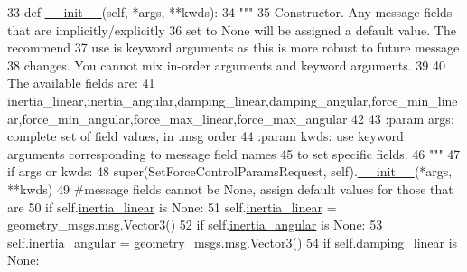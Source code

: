 \begin{DoxyCode}
33   \textcolor{keyword}{def }\hyperlink{classjaco__msgs_1_1srv_1_1__SetForceControlParams_1_1SetForceControlParamsRequest_a70d95a44801ab7fb588b293e5a4720b1}{\_\_init\_\_}(self, *args, **kwds):
34     \textcolor{stringliteral}{"""}
35 \textcolor{stringliteral}{    Constructor. Any message fields that are implicitly/explicitly}
36 \textcolor{stringliteral}{    set to None will be assigned a default value. The recommend}
37 \textcolor{stringliteral}{    use is keyword arguments as this is more robust to future message}
38 \textcolor{stringliteral}{    changes.  You cannot mix in-order arguments and keyword arguments.}
39 \textcolor{stringliteral}{}
40 \textcolor{stringliteral}{    The available fields are:}
41 \textcolor{stringliteral}{      
       inertia\_linear,inertia\_angular,damping\_linear,damping\_angular,force\_min\_linear,force\_min\_angular,force\_max\_linear,force\_max\_angular}
42 \textcolor{stringliteral}{}
43 \textcolor{stringliteral}{    :param args: complete set of field values, in .msg order}
44 \textcolor{stringliteral}{    :param kwds: use keyword arguments corresponding to message field names}
45 \textcolor{stringliteral}{    to set specific fields.}
46 \textcolor{stringliteral}{    """}
47     \textcolor{keywordflow}{if} args \textcolor{keywordflow}{or} kwds:
48       super(SetForceControlParamsRequest, self).\hyperlink{classjaco__msgs_1_1srv_1_1__SetForceControlParams_1_1SetForceControlParamsRequest_a70d95a44801ab7fb588b293e5a4720b1}{\_\_init\_\_}(*args, **kwds)
49       \textcolor{comment}{#message fields cannot be None, assign default values for those that are}
50       \textcolor{keywordflow}{if} self.\hyperlink{classjaco__msgs_1_1srv_1_1__SetForceControlParams_1_1SetForceControlParamsRequest_ab5cf9f4019e6c446ca473ca2a38492ad}{inertia\_linear} \textcolor{keywordflow}{is} \textcolor{keywordtype}{None}:
51         self.\hyperlink{classjaco__msgs_1_1srv_1_1__SetForceControlParams_1_1SetForceControlParamsRequest_ab5cf9f4019e6c446ca473ca2a38492ad}{inertia\_linear} = geometry\_msgs.msg.Vector3()
52       \textcolor{keywordflow}{if} self.\hyperlink{classjaco__msgs_1_1srv_1_1__SetForceControlParams_1_1SetForceControlParamsRequest_a4ffea018c8ffc3cf44cdd7d68c4ca918}{inertia\_angular} \textcolor{keywordflow}{is} \textcolor{keywordtype}{None}:
53         self.\hyperlink{classjaco__msgs_1_1srv_1_1__SetForceControlParams_1_1SetForceControlParamsRequest_a4ffea018c8ffc3cf44cdd7d68c4ca918}{inertia\_angular} = geometry\_msgs.msg.Vector3()
54       \textcolor{keywordflow}{if} self.\hyperlink{classjaco__msgs_1_1srv_1_1__SetForceControlParams_1_1SetForceControlParamsRequest_a9ab3c9bb200986f210612fa05012ab2f}{damping\_linear} \textcolor{keywordflow}{is} \textcolor{keywordtype}{None}:

\end{DoxyCode}
